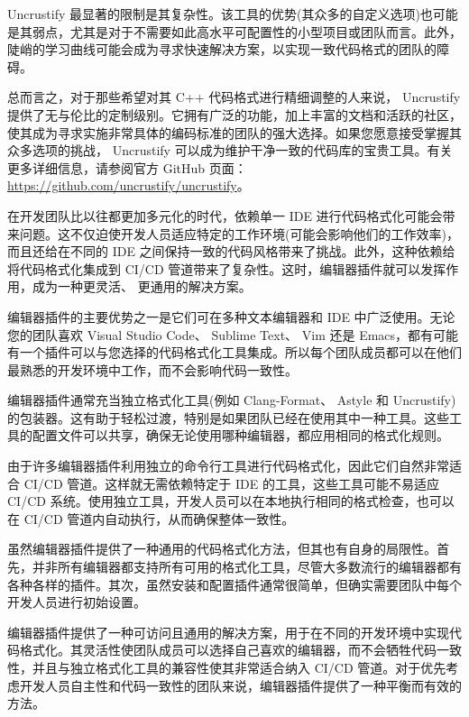 Uncrustify 最显著的限制是其复杂性。该工具的优势(其众多的自定义选项)也可能是其弱点，尤其是对于不需要如此高水平可配置性的小型项目或团队而言。此外，陡峭的学习曲线可能会成为寻求快速解决方案，以实现一致代码格式的团队的障碍。

总而言之，对于那些希望对其 C++ 代码格式进行精细调整的人来说， Uncrustify 提供了无与伦比的定制级别。它拥有广泛的功能，加上丰富的文档和活跃的社区，使其成为寻求实施非常具体的编码标准的团队的强大选择。如果您愿意接受掌握其众多选项的挑战， Uncrustify 可以成为维护干净一致的代码库的宝贵工具。有关更多详细信息，请参阅官方 GitHub 页面： \url{https://github.com/uncrustify/uncrustify}。


在开发团队比以往都更加多元化的时代，依赖单一 IDE 进行代码格式化可能会带来问题。这不仅迫使开发人员适应特定的工作环境(可能会影响他们的工作效率)，而且还给在不同的 IDE 之间保持一致的代码风格带来了挑战。此外，这种依赖给将代码格式化集成到 CI/CD 管道带来了复杂性。这时，编辑器插件就可以发挥作用，成为一种更灵活、 更通用的解决方案。

编辑器插件的主要优势之一是它们可在多种文本编辑器和 IDE 中广泛使用。无论您的团队喜欢 Visual Studio Code、 Sublime Text、 Vim 还是 Emacs，都有可能有一个插件可以与您选择的代码格式化工具集成。所以每个团队成员都可以在他们最熟悉的开发环境中工作，而不会影响代码一致性。

编辑器插件通常充当独立格式化工具(例如 Clang-Format、 Astyle 和 Uncrustify)的包装器。这有助于轻松过渡，特别是如果团队已经在使用其中一种工具。这些工具的配置文件可以共享，确保无论使用哪种编辑器，都应用相同的格式化规则。

由于许多编辑器插件利用独立的命令行工具进行代码格式化，因此它们自然非常适合 CI/CD 管道。这样就无需依赖特定于 IDE 的工具，这些工具可能不易适应 CI/CD 系统。使用独立工具，开发人员可以在本地执行相同的格式检查，也可以在 CI/CD 管道内自动执行，从而确保整体一致性。

虽然编辑器插件提供了一种通用的代码格式化方法，但其也有自身的局限性。首先，并非所有编辑器都支持所有可用的格式化工具，尽管大多数流行的编辑器都有各种各样的插件。其次，虽然安装和配置插件通常很简单，但确实需要团队中每个开发人员进行初始设置。

编辑器插件提供了一种可访问且通用的解决方案，用于在不同的开发环境中实现代码格式化。其灵活性使团队成员可以选择自己喜欢的编辑器，而不会牺牲代码一致性，并且与独立格式化工具的兼容性使其非常适合纳入 CI/CD 管道。对于优先考虑开发人员自主性和代码一致性的团队来说，编辑器插件提供了一种平衡而有效的方法。


